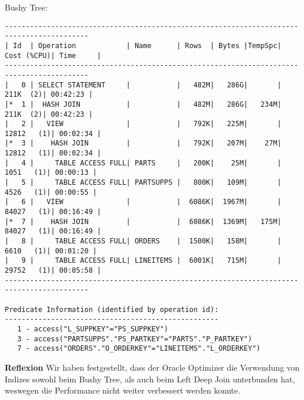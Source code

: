 \documentclass[10pt]{article}
\begin{document}
Bushy Tree:
\begin{lstlisting}[style=queryexecutionplan]
------------------------------------------------------------------------------------------
| Id  | Operation            | Name      | Rows  | Bytes |TempSpc| Cost (%CPU)| Time     |
------------------------------------------------------------------------------------------
|   0 | SELECT STATEMENT     |           |   482M|   286G|       |   211K  (2)| 00:42:23 |
|*  1 |  HASH JOIN           |           |   482M|   286G|   234M|   211K  (2)| 00:42:23 |
|   2 |   VIEW               |           |   792K|   225M|       | 12812   (1)| 00:02:34 |
|*  3 |    HASH JOIN         |           |   792K|   207M|    27M| 12812   (1)| 00:02:34 |
|   4 |     TABLE ACCESS FULL| PARTS     |   200K|    25M|       |  1051   (1)| 00:00:13 |
|   5 |     TABLE ACCESS FULL| PARTSUPPS |   800K|   109M|       |  4526   (1)| 00:00:55 |
|   6 |   VIEW               |           |  6086K|  1967M|       | 84027   (1)| 00:16:49 |
|*  7 |    HASH JOIN         |           |  6086K|  1369M|   175M| 84027   (1)| 00:16:49 |
|   8 |     TABLE ACCESS FULL| ORDERS    |  1500K|   158M|       |  6610   (1)| 00:01:20 |
|   9 |     TABLE ACCESS FULL| LINEITEMS |  6001K|   715M|       | 29752   (1)| 00:05:58 |
------------------------------------------------------------------------------------------
 
Predicate Information (identified by operation id):
---------------------------------------------------
   1 - access("L_SUPPKEY"="PS_SUPPKEY")
   3 - access("PARTSUPPS"."PS_PARTKEY"="PARTS"."P_PARTKEY")
   7 - access("ORDERS"."O_ORDERKEY"="LINEITEMS"."L_ORDERKEY")
\end{lstlisting}
\textbf{Reflexion} \newline
Wir haben festgestellt, dass der Oracle Optimizer die Verwendung von Indizes sowohl beim Bushy Tree, als auch beim Left Deep Join unterbunden hat, weswegen die Performance nicht weiter verbessert werden konnte.
\end{document}
